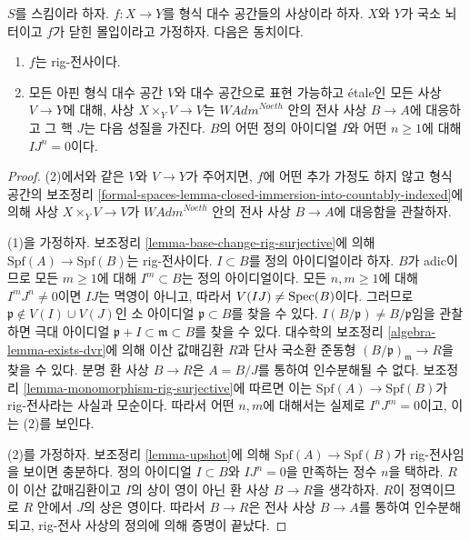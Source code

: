 \begin{lemma}
\label{lemma-closed-immersion-rig-surjective}
$S$를 스킴이라 하자. $f : X \to Y$를 형식 대수 공간들의 사상이라 하자.
$X$와 $Y$가 국소 뇌터이고 $f$가 닫힌 몰입이라고 가정하자. 다음은 동치이다.
\begin{enumerate}
\item $f$는 rig-전사이다.
\item 모든 아핀 형식 대수 공간 $V$와 대수 공간으로 표현 가능하고
\'etale인 모든 사상 $V \to Y$에 대해, 사상 $X \times_Y V \to V$는
$\textit{WAdm}^{Noeth}$ 안의 전사 사상 $B \to A$에 대응하고 그 핵 $J$는
다음 성질을 가진다. $B$의 어떤 정의 아이디얼 $I$와 어떤 $n \geq 1$에
대해 $IJ^n = 0$이다.
\end{enumerate}
\end{lemma}

\begin{proof}
(2)에서와 같은 $V$와 $V \to Y$가 주어지면, $f$에 어떤 추가 가정도
하지 않고 형식 공간의 보조정리
\ref{formal-spaces-lemma-closed-immersion-into-countably-indexed}에 의해
사상 $X \times_Y V \to V$가 $\textit{WAdm}^{Noeth}$ 안의 전사 사상
$B \to A$에 대응함을 관찰하자.

\medskip\noindent
(1)을 가정하자. 보조정리 \ref{lemma-base-change-rig-surjective}에 의해
$\text{Spf}(A) \to \text{Spf}(B)$는 rig-전사이다.
$I \subset B$를 정의 아이디얼이라 하자. $B$가 adic이므로 모든
$m \geq 1$에 대해 $I^m \subset B$는 정의 아이디얼이다.
모든 $n, m \geq 1$에 대해 $I^m J^n \not = 0$이면 $IJ$는 멱영이 아니고,
따라서 $V(IJ) \not = \mathop{\mathrm{Spec}}(B)$이다. 그러므로
$\mathfrak p \not \in V(I) \cup V(J)$인 소 아이디얼
$\mathfrak p \subset B$를 찾을 수 있다. $I(B/\mathfrak p) \not =
B/\mathfrak p$임을 관찰하면 극대 아이디얼
$\mathfrak p + I \subset \mathfrak m \subset B$를 찾을 수 있다.
대수학의 보조정리 \ref{algebra-lemma-exists-dvr}에 의해 이산 값매김환 $R$과
단사 국소환 준동형 $(B/\mathfrak p)_\mathfrak m \to R$을 찾을 수 있다.
분명 환 사상 $B \to R$은 $A = B/J$를 통하여 인수분해될 수 없다.
보조정리 \ref{lemma-monomorphism-rig-surjective}에 따르면 이는
$\text{Spf}(A) \to \text{Spf}(B)$가 rig-전사라는 사실과 모순이다.
따라서 어떤 $n, m$에 대해서는 실제로 $I^n J^m = 0$이고, 이는 (2)를 보인다.

\medskip\noindent
(2)를 가정하자. 보조정리 \ref{lemma-upshot}에 의해
$\text{Spf}(A) \to \text{Spf}(B)$가 rig-전사임을 보이면 충분하다.
정의 아이디얼 $I \subset B$와 $I J^n = 0$을 만족하는 정수 $n$을 택하라.
$R$이 이산 값매김환이고 $I$의 상이 영이 아닌 환 사상 $B \to R$을
생각하자. $R$이 정역이므로 $R$ 안에서 $J$의 상은 영이다. 따라서
$B \to R$은 전사 사상 $B \to A$를 통하여 인수분해되고,
rig-전사 사상의 정의에 의해 증명이 끝났다.
\end{proof}

